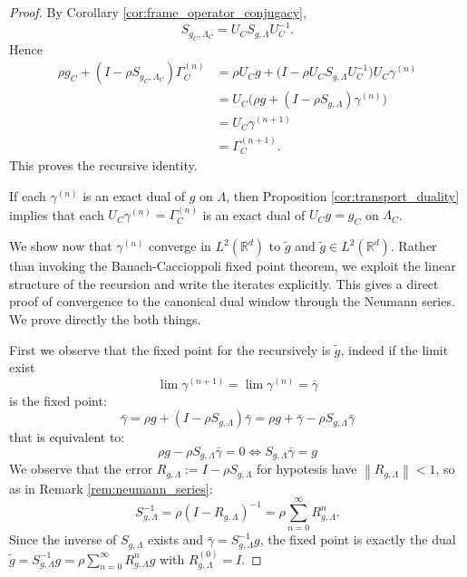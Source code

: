 \documentclass[final,1p,times,authoryear]{elsarticle}
\theoremstyle{definition}
\newcommand{\1}{\mathbf{1}}
\begin{document}
\begin{proof}
By Corollary \ref{cor:frame_operator_conjugacy},
$$
S_{g_C,\Lambda_C}=U_C S_{g,\Lambda} U_C^{-1}.
$$
Hence
\begin{align*}
\rho g_C + (I-\rho S_{g_C,\Lambda_C})\Gamma_C^{(n)}
&=
\rho U_C g + \big(I-\rho U_C S_{g,\Lambda}U_C^{-1}\big)U_C\gamma^{(n)}\\
&=
U_C\big(\rho g + (I-\rho S_{g,\Lambda})\gamma^{(n)}\big)\\
&=
U_C\gamma^{(n+1)}\\
&=
\Gamma_C^{(n+1)}.
\end{align*}
This proves the recursive identity.

If each $\gamma^{(n)}$ is an exact dual of $g$ on $\Lambda$, then Proposition
\ref{cor:transport_duality} implies that each $U_C\gamma^{(n)}=\Gamma_C^{(n)}$
is an exact dual of $U_C g=g_C$ on $\Lambda_C$.


We show now that $\gamma^{(n)}$ converge in $L^2(\mathbb{R}^d)$ to $\tilde{g}$ and $\tilde{g} \in L^2(\mathbb{R}^d)$. Rather than invoking the Banach-Caccioppoli fixed point theorem, we exploit the linear structure of the recursion and write the iterates explicitly. This gives a direct proof of convergence to the canonical dual window through the Neumann series. We prove directly the both things.

First we observe that the fixed point for the recursively is $\tilde{g}$, indeed if the limit exist
\begin{equation}
\lim\gamma^{(n+1)}=\lim\gamma^{(n)}=\bar{\gamma}
\end{equation}
is the fixed point:
\begin{equation}
    \bar{\gamma}=\rho g+(I-\rho S_{g,\Lambda})\bar{\gamma}=\rho g+\bar{\gamma}-\rho S_{g,\Lambda}\bar{\gamma}
\end{equation}
that is equivalent to:
\begin{equation}
    \rho g-\rho S_{g,\Lambda}\bar{\gamma}=0 \iff S_{g,\Lambda}\bar{\gamma}=g
\end{equation}
We observe that the error $R_{g,\Lambda}:=I-\rho S_{g,\Lambda}$ for hypotesis have $\left\|R_{g,\Lambda}\right\|<1$, so as in Remark \ref{rem:neumann_series}:
\begin{equation}
    S_{g,\Lambda}^{-1}=\rho(I-R_{g,\Lambda})^{-1}=\rho\displaystyle\sum_{n=0}^{\infty}R_{g,\Lambda}^n.
\end{equation}
Since the inverse of $S_{g,\Lambda}$ exists and $\bar{\gamma}=S^{-1}_{g,\Lambda}g$, the fixed point is exactly the dual $\tilde{g}=S^{-1}_{g,\Lambda}g=\rho\displaystyle\sum_{n=0}^{\infty}R_{g,\Lambda}^ng$ with $R^{(0)}_{g,\Lambda}=I$.


\end{proof}
\end{document}
